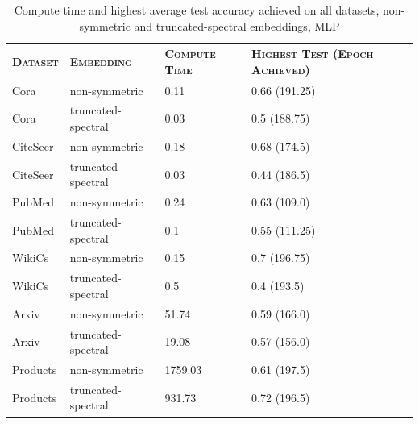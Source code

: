 \begin{table}\caption{Compute time and highest average test accuracy achieved on all datasets, non-symmetric and truncated-spectral embeddings, MLP}\begin{center}\begin{tabular}{ | m{2cm} | m{2cm}| m{2cm} | m{2cm} }\hline\textsc{Dataset} & \textsc{Embedding} & \textsc{Compute Time} & \textsc{Highest Test (Epoch Achieved)}\\\hline Cora & non-symmetric & 0.11 & 0.66 (191.25)\\\hline Cora & truncated-spectral & 0.03 & 0.5 (188.75)\\\hline CiteSeer & non-symmetric & 0.18 & 0.68 (174.5)\\\hline CiteSeer & truncated-spectral & 0.03 & 0.44 (186.5)\\\hline PubMed & non-symmetric & 0.24 & 0.63 (109.0)\\\hline PubMed & truncated-spectral & 0.1 & 0.55 (111.25)\\\hline WikiCs & non-symmetric & 0.15 & 0.7 (196.75)\\\hline WikiCs & truncated-spectral & 0.5 & 0.4 (193.5)\\\hline Arxiv & non-symmetric & 51.74 & 0.59 (166.0)\\\hline Arxiv & truncated-spectral & 19.08 & 0.57 (156.0)\\\hline Products & non-symmetric & 1759.03 & 0.61 (197.5)\\\hline Products & truncated-spectral & 931.73 & 0.72 (196.5)\\\hline\end{tabular}\end{center}\end{table}